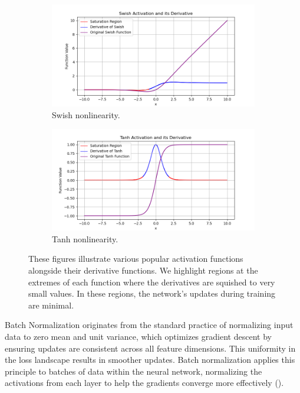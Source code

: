 \begin{figure}[htbp]
  \begin{subfigure}{0.49\textwidth}
    \includegraphics[width=\linewidth]{images/methods_mono/batch_norm/swish.png}
    \caption{Swish nonlinearity.}
    \label{fig:image3}
  \end{subfigure}
  \hfill
  \begin{subfigure}{0.49\textwidth}
    \includegraphics[width=\linewidth]{images/methods_mono/batch_norm/tanh.png}
    \caption{Tanh nonlinearity.}
    \label{fig:image4}
  \end{subfigure}
    \captionsetup{justification=justified, singlelinecheck=false, width=1\linewidth, labelfont=bf} 
  \caption{These figures illustrate various popular activation functions alongside their derivative functions. We highlight regions at the extremes of each function where the derivatives are squished to very small values. In these regions, the network's updates during training are minimal.}
  \label{fig:2x2grid}
\end{figure}

\noindent Batch Normalization originates from the standard practice of normalizing input data to zero mean and unit variance, which optimizes gradient descent by ensuring updates are consistent across all feature dimensions. This uniformity in the loss landscape results in smoother updates. Batch normalization applies this principle to batches of data within the neural network, normalizing the activations from each layer to help the gradients converge more effectively (\cite{ioffe2015batch}).

